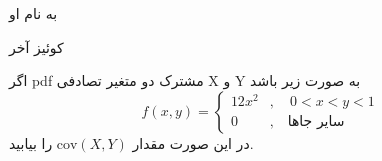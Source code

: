\documentclass[10pt,letterpaper]{article}
\begin{document}
\Large
\begin{center}
به نام او

کوئیز آخر

\hrulefill
\end{center}

اگر pdf مشترک دو متغیر تصادفی X و Y به صورت زیر باشد
\[
f(x,y)=\begin{cases}
12x^2&,\quad 0<x<y<1\\
0&,\quad \text{سایر جاها}
\end{cases}
\]
در این صورت مقدار 
$
\text{cov}(X,Y)
$
را بیابید.
\end{document}
